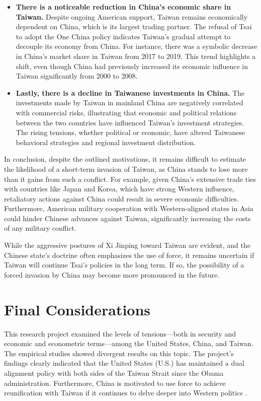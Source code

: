 \documentclass{article}
\begin{document}
\begin{itemize}
    \item \textbf{There is a noticeable reduction in China’s economic share in Taiwan.} Despite ongoing American support, Taiwan remains economically dependent on China, which is its largest trading partner. The refusal of Tsai to adopt the One China policy indicates Taiwan’s gradual attempt to decouple its economy from China. For instance, there was a symbolic decrease in China’s market share in Taiwan from 2017 to 2019. This trend highlights a shift, even though China had previously increased its economic influence in Taiwan significantly from 2000 to 2008.
    \item \textbf{Lastly, there is a decline in Taiwanese investments in China.} The investments made by Taiwan in mainland China are negatively correlated with commercial risks, illustrating that economic and political relations between the two countries have influenced Taiwan's investment strategies. The rising tensions, whether political or economic, have altered Taiwanese behavioral strategies and regional investment distribution.
\end{itemize}

In conclusion, despite the outlined motivations, it remains difficult to estimate the likelihood of a short-term invasion of Taiwan, as China stands to lose more than it gains from such a conflict. For example, given China's extensive trade ties with countries like Japan and Korea, which have strong Western influence, retaliatory actions against China could result in severe economic difficulties. Furthermore, American military cooperation with Western-aligned states in Asia could hinder Chinese advances against Taiwan, significantly increasing the costs of any military conflict.

While the aggressive postures of Xi Jinping toward Taiwan are evident, and the Chinese state's doctrine often emphasizes the use of force, it remains uncertain if Taiwan will continue Tsai's policies in the long term. If so, the possibility of a forced invasion by China may become more pronounced in the future.

\section{Final Considerations}

This research project examined the levels of tensions—both in security and economic and econometric terms—among the United States, China, and Taiwan. The empirical studies showed divergent results on this topic. The project's findings clearly indicated that the United States (U.S.) has maintained a dual alignment policy with both sides of the Taiwan Strait since the Obama administration. Furthermore, China is motivated to use force to achieve reunification with Taiwan if it continues to delve deeper into Western politics \citep{huang_xi_jinping_taiwan_policy}.
\end{document}
